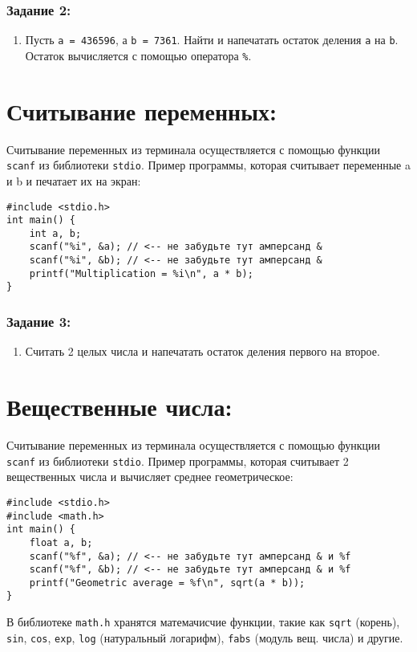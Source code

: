 \documentclass{article}
\begin{document}
\subsubsection*{Задание 2:}
\begin{enumerate}
\item Пусть \texttt{a = 436596}, а \texttt{b = 7361}. Найти и напечатать остаток деления \texttt{a} на \texttt{b}. Остаток вычисляется с помощью оператора \texttt{\%}.
\end{enumerate}

\section*{Считывание переменных:}
Считывание переменных из терминала осуществляется с помощью функции \texttt{scanf} из библиотеки \texttt{stdio}.
Пример программы, которая считывает переменные a и b и печатает их на экран:
\begin{lstlisting}
#include <stdio.h>
int main() {
    int a, b;
    scanf("%i", &a); // <-- не забудьте тут амперсанд &
    scanf("%i", &b); // <-- не забудьте тут амперсанд &
    printf("Multiplication = %i\n", a * b);
}
\end{lstlisting}
\subsubsection*{Задание 3:}
\begin{enumerate}
\item Считать 2 целых числа и напечатать остаток деления первого на второе.
\end{enumerate}



\section*{Вещественные числа:}
Считывание переменных из терминала осуществляется с помощью функции \texttt{scanf} из библиотеки \texttt{stdio}.
Пример программы, которая считывает 2 вещественных числа и вычисляет среднее геометрическое:
\begin{lstlisting}
#include <stdio.h>
#include <math.h>
int main() {
    float a, b;
    scanf("%f", &a); // <-- не забудьте тут амперсанд & и %f
    scanf("%f", &b); // <-- не забудьте тут амперсанд & и %f
    printf("Geometric average = %f\n", sqrt(a * b));
}
\end{lstlisting}
В библиотеке \texttt{math.h} хранятся матемачисчие функции, такие как \texttt{sqrt} (корень), \texttt{sin}, \texttt{cos}, \texttt{exp}, \texttt{log} (натуральный логарифм), \texttt{fabs} (модуль вещ. числа) и другие. 
\end{document}
